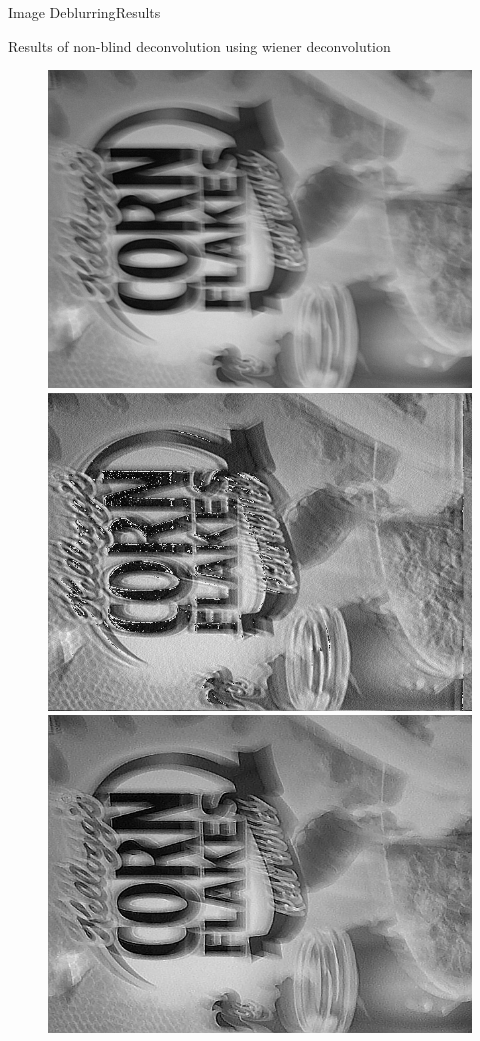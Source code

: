 \documentclass{beamer}
\begin{document}
\begin{frame}{Image Deblurring}{Results}

Results of non-blind deconvolution using wiener deconvolution

\begin{figure}[H]
\begin{center}
	\resizebox{30mm}{!} {\includegraphics {../images/deblur/imblur.png}}
	\resizebox{30mm}{!} {\includegraphics {../images/deblur/imdeblur.png}}
	\resizebox{30mm}{!} {\includegraphics {../images/deblur/jia_blind_deconv.png}}

\end{center}
\end{figure}
\end{frame}
\end{document}
